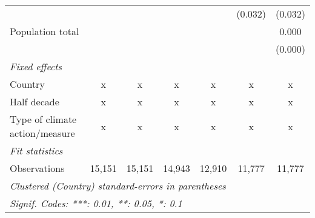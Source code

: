 \begin{tabular}{lcccccc}
                                          &              &              &             &         & (0.032) & (0.032)\\   
   Population total                       &              &              &             &         &         & 0.000\\   
                                          &              &              &             &         &         & (0.000)\\   
   \emph{Fixed effects}\\
   Country                                & x            & x            & x           & x       & x       & x\\  
   Half decade                            & x            & x            & x           & x       & x       & x\\  
   Type of climate action/measure         & x            & x            & x           & x       & x       & x\\  
   \midrule \emph{Fit statistics}\\
   Observations                           & 15,151       & 15,151       & 14,943      & 12,910  & 11,777  & 11,777\\  
   \midrule
   \multicolumn{7}{l}{\emph{Clustered (Country) standard-errors in parentheses}}\\
   \multicolumn{7}{l}{\emph{Signif. Codes: ***: 0.01, **: 0.05, *: 0.1}}\\
\end{tabular}
\par\endgroup


